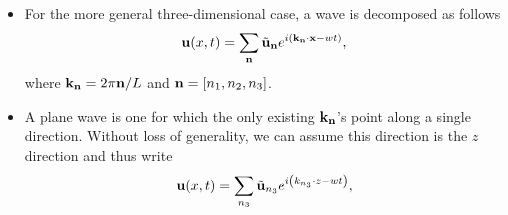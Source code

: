 \documentclass[a4paper,11pt]{report}
\begin{document}
\begin{itemize}
\item For the more general three-dimensional case, a wave is decomposed as follows
\begin{equation}
    \label{eq:electrodynamics_3d_wave}
    \mathbf{u}(x,t) = \sum_{\mathbf{n}} \tilde{\mathbf{u}}_{\mathbf{n}} e^{i \left ( \mathbf{k}_{\mathbf{n}} \cdot \mathbf{x} - wt \right )},
\end{equation}
where $\mathbf{k}_{\mathbf{n}} = 2 \pi \mathbf{n} / L$ and $\mathbf{n} = [n_1, n_2, n_3]$.

\item A plane wave is one for which the only existing $\mathbf{k}_{\mathbf{n}}$'s point along a single direction. Without loss of generality, we can assume this direction is the $z$ direction and thus write
\begin{equation}
    \mathbf{u}(x,t) = \sum_{n_3} \tilde{\mathbf{u}}_{n_3} e^{i \left ( k_{n_3} \cdot z - wt \right )},
\end{equation}

\end{itemize}

\end{document}
